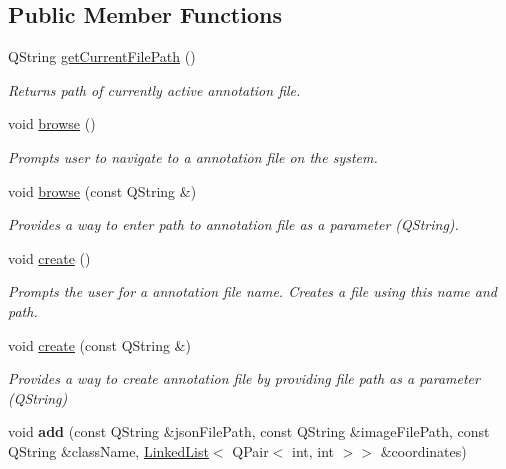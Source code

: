 \subsection*{Public Member Functions}
\begin{DoxyCompactItemize}
\item 
Q\+String \hyperlink{classAnnotationModel_a704170b9d4cc9e6b62e0bc22d17f6e17}{get\+Current\+File\+Path} ()
\begin{DoxyCompactList}\small\item\em Returns path of currently active annotation file. \end{DoxyCompactList}\item 
void \hyperlink{classAnnotationModel_aa43f69c5431ede4dc744ae9b61b49f6c}{browse} ()
\begin{DoxyCompactList}\small\item\em Prompts user to navigate to a annotation file on the system. \end{DoxyCompactList}\item 
void \hyperlink{classAnnotationModel_a54f9ffa4151a1bdcaa1d5ab3dee87679}{browse} (const Q\+String \&)
\begin{DoxyCompactList}\small\item\em Provides a way to enter path to annotation file as a parameter (Q\+String). \end{DoxyCompactList}\item 
void \hyperlink{classAnnotationModel_ac4c6850c8d0f704c3bf5bef486992690}{create} ()
\begin{DoxyCompactList}\small\item\em Prompts the user for a annotation file name. Creates a file using this name and path. \end{DoxyCompactList}\item 
void \hyperlink{classAnnotationModel_ac5062c8663670a312132929f16e4be64}{create} (const Q\+String \&)
\begin{DoxyCompactList}\small\item\em Provides a way to create annotation file by providing file path as a parameter (Q\+String) \end{DoxyCompactList}\item 
\mbox{\label{classAnnotationModel_a4b6bbcae3cae275254085c857609413e}} 
void {\bfseries add} (const Q\+String \&json\+File\+Path, const Q\+String \&image\+File\+Path, const Q\+String \&class\+Name, \hyperlink{classLinkedList}{Linked\+List}$<$ Q\+Pair$<$ int, int $>$$>$ \&coordinates)
$$
\end{DoxyCompactItemize}
